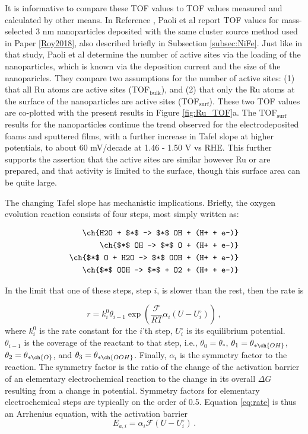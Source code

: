 It is informative to compare these TOF values to TOF values measured and calculated by other means. In Reference , Paoli et al report TOF values for mass-selected 3 nm  nanoparticles deposited with the same cluster source method used in Paper \ref{Roy2018}, also described briefly in Subsection \ref{subsec:NiFe}. Just like in that study, Paoli et al determine the number of active sites via the loading of the nanoparticles, which is known via the deposition current and the size of the nanoparicles. They compare two assumptions for the number of active sites: (1) that all Ru atoms are active sites (TOF$_{\text{bulk}}$), and (2) that only the Ru atoms at the surface of the  nanoparticles are active sites  (TOF$_{\text{surf}}$). These two TOF values are co-plotted with the present results in Figure \ref{fig:Ru_TOF}a. The TOF$_{\text{surf}}$ results for the nanoparticles continue the trend observed for the electrodeposited foams and sputtered films, with a further increase in Tafel slope at higher potentials, to about 60 mV/decade at 1.46 - 1.50 V vs RHE. This further supports the assertion that the active sites are similar however Ru or  are prepared, and that activity is limited to the surface, though this surface area can be quite large.

The changing Tafel slope has mechanistic implications\cite{Shinawaga2015}. Briefly, the oxygen evolution reaction consists of four steps, most simply written as\cite{Man2011, Busch2016}:

\begin{align}
\ch{H2O + $*$ -> $*$ OH + (H+ + e-)}\label{rxn:OER_s1}\\
\ch{$*$ OH -> $*$ O + (H+ + e-)}\label{rxn:OER_s2}\\
\ch{$*$ O + H2O -> $*$ OOH + (H+ + e-)}\label{rxn:OER_s3}\\
\ch{$*$ OOH -> $*$ + O2 + (H+ + e-)}\label{rxn:OER_s4}
\end{align}

In the limit that one of these steps, step $i$, is slower than the rest, then the rate is

\begin{equation}
r = k^0_i\theta_{i-1}\exp\left(\frac{\mathcal{F}}{RT}\alpha_i(U-U^\circ_i)\right)\,,\label{eq:rate}
\end{equation}
where $k^0_i$ is the rate constant for the $i$'th step, $U^\circ_i$ is its equilibrium potential. $\theta_{i-1}$ is the coverage of the reactant to that step, i.e., $\theta_0 = \theta_{*}$, $\theta_1 = \theta_{* \ch{OH}}$, $\theta_2 = \theta_{* \ch{O}}$, and $\theta_3 = \theta_{* \ch{OOH}}$. Finally, $\alpha_i$ is the symmetry factor to the reaction. The symmetry factor is the ratio of the change of the activation barrier of an elementary electrochemical reaction to the change in its overall $\Delta G$ resulting from a change in potential\cite{Bard2001}. Symmetry factors for elementary electrochemical steps are typically on the order of 0.5. Equation \ref{eq:rate} is thus an Arrhenius equation, with the activation barrier
\begin{equation}
E_{a,i} = \alpha_i\mathcal{F}(U - U^\circ_i)\,.
\end{equation}

